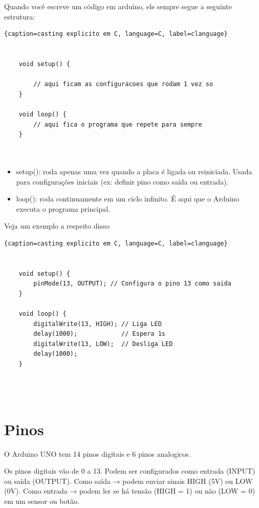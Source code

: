 \documentclass{report}
\begin{document}
	
	Quando você escreve um código em arduíno, ele sempre segue a seguinte estrutura:
	
	
	\begin{center}
		
		\begin{lstlisting}{caption=casting explicito em C, language=C, label=clanguage}
			
					
	void setup() {
		
		// aqui ficam as configuracoes que rodam 1 vez so
	}
				
	void loop() {
		// aqui fica o programa que repete para sempre
	}
	
			
		\end{lstlisting}
	\end{center}
	
	

	
	\begin{itemize}
		\item setup(): roda apenas uma vez quando a placa é ligada ou reiniciada. Usada para configurações iniciais (ex: definir pino como saída ou entrada).
		\item loop(): roda continuamente em um ciclo infinito. É aqui que o Arduino executa o programa principal.
	\end{itemize}
	
	Veja um exemplo a respeito disso:
	
		
	\begin{center}
		
		\begin{lstlisting}{caption=casting explicito em C, language=C, label=clanguage}
			
			
	void setup() {
		pinMode(13, OUTPUT); // Configura o pino 13 como saida
	}

	void loop() {
		digitalWrite(13, HIGH); // Liga LED
		delay(1000);            // Espera 1s
		digitalWrite(13, LOW);  // Desliga LED
		delay(1000);
	}

			
			
		\end{lstlisting}
	\end{center}
	

	\section{Pinos}
	
	O Arduino UNO tem 14 pinos digitais e 6 pinos analogicos.
	
	Os pinos digitais vão de 0 a 13. Podem ser configurados como entrada (INPUT) ou saída (OUTPUT). Como saída → podem enviar sinais HIGH (5V) ou LOW (0V). Como entrada → podem ler se há tensão (HIGH = 1) ou não (LOW = 0) em um sensor ou botão.
\end{document}
